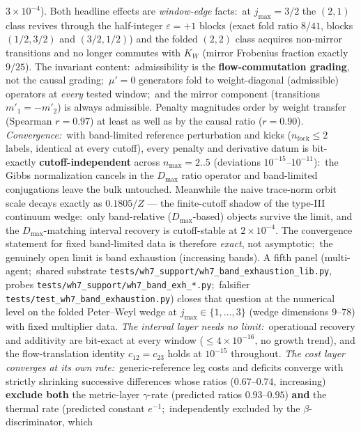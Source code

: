 \documentclass[11pt,a4paper]{article}
\theoremstyle{plain}
\theoremstyle{definition}
\begin{document}
\begin{enumerate}
$3{\times}10^{-4}$). Both headline effects are \emph{window-edge}
facts:\ at $j_{\max} = 3/2$ the $(2,1)$ class revives through the
half-integer $\varepsilon = +1$ blocks (exact fold ratio $8/41$,
blocks $(1/2,3/2)$ and $(3/2,1/2)$) and the folded $(2,2)$ class
acquires non-mirror transitions and no longer commutes with $K_{W}$
(mirror Frobenius fraction exactly $9/25$). The invariant content:\
admissibility is the \textbf{flow-commutation grading}, not the
causal grading;\ $\mu' = 0$ generators fold to weight-diagonal
(admissible) operators at \emph{every} tested window;\ and the
mirror component (transitions $m'_{1} = -m'_{2}$) is always
admissible. Penalty magnitudes order by weight transfer (Spearman
$r = 0.97$) at least as well as by the causal ratio ($r = 0.90$). \emph{Convergence:}\ with band-limited reference
perturbation and kicks ($n_{\mathrm{fock}} \le 2$ labels, identical
at every cutoff), every penalty and derivative datum is bit-exactly
\textbf{cutoff-independent} across $n_{\max} = 2..5$ (deviations
$10^{-15}$–$10^{-11}$):\ the Gibbs normalization cancels in the
$D_{\max}$ ratio operator and band-limited conjugations leave the
bulk untouched. Meanwhile the naive trace-norm orbit scale decays
exactly as $0.1805/Z$ — the finite-cutoff shadow of the type-III
continuum wedge:\ only band-relative ($D_{\max}$-based) objects
survive the limit, and the $D_{\max}$-matching interval recovery is
cutoff-stable at $2{\times}10^{-4}$. The convergence statement for
fixed band-limited data is therefore \emph{exact}, not asymptotic;\
the genuinely open limit is band exhaustion (increasing bands). A
fifth panel (multi-agent;\ shared substrate
\texttt{tests/wh7\_support/wh7\_band\_exhaustion\_lib.py}, probes
\texttt{tests/wh7\_support/wh7\_band\_exh\_*.py};\ falsifier
\texttt{tests/test\_wh7\_band\_exhaustion.py}) closes that question at
the numerical level on the folded Peter--Weyl wedge at
$j_{\max} \in \{1, \ldots, 3\}$ (wedge dimensions $9$--$78$) with
fixed multiplier data. \emph{The interval layer needs no limit:}\
operational recovery and additivity are bit-exact at every window
($\le 4{\times}10^{-16}$, no growth trend), and the flow-translation
identity $c_{12} = c_{23}$ holds at $10^{-15}$ throughout.
\emph{The cost layer converges at its own rate:}\ generic-reference
leg costs and deficits converge with strictly shrinking successive
differences whose ratios ($0.67$--$0.74$, increasing) \textbf{exclude
both} the metric-layer $\gamma$-rate (predicted ratios
$0.93$--$0.95$) \textbf{and} the thermal rate (predicted constant
$e^{-1}$;\ independently excluded by the $\beta$-discriminator, which

\end{enumerate}
\end{document}

